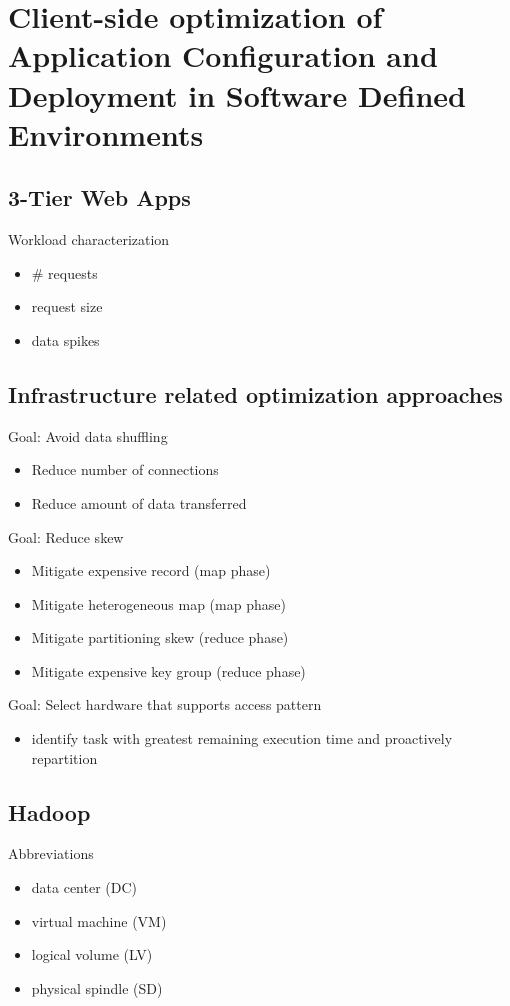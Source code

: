 \section{Client-side optimization of Application Configuration and Deployment in Software Defined Environments}

\subsection{3-Tier Web Apps}
	Workload characterization
	\begin{itemize}
		\item \# requests
		\item request size
		\item data spikes
	\end{itemize}
	
\subsection{Infrastructure related optimization approaches}
	
	Goal: Avoid data shuffling \cite{Zhou2012}
	\begin{itemize}
		\item Reduce number of connections
		\item Reduce amount of data transferred
	\end{itemize}
	
	Goal: Reduce skew \cite{Kwon2012}
	\begin{itemize}
		\item Mitigate expensive record (map phase)
		\item Mitigate heterogeneous map (map phase)
		\item Mitigate partitioning skew (reduce phase)
		\item Mitigate expensive key group (reduce phase)
	\end{itemize}
	
	Goal: Select hardware that supports access pattern
	
	
	\begin{itemize}
		\item identify task with greatest remaining execution time and proactively repartition
	\end{itemize}
\subsection{Hadoop}
	Abbreviations
	\begin{itemize}
		\item data center (DC)
		\item virtual machine (VM)
		\item logical volume (LV)
		\item physical spindle (SD)
	\end{itemize}

